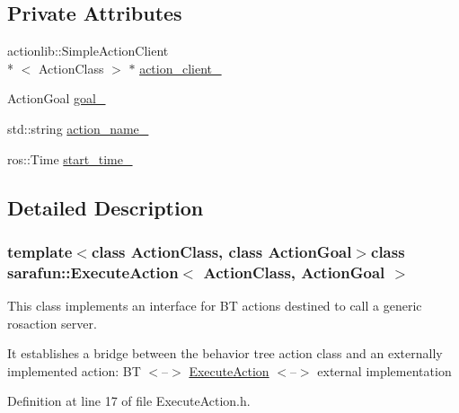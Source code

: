 \subsection*{Private Attributes}
\begin{DoxyCompactItemize}
\item 
actionlib\-::\-Simple\-Action\-Client\\*
$<$ Action\-Class $>$ $\ast$ \hyperlink{classsarafun_1_1ExecuteAction_a8f41836853e5a9daa346b90b865fd113_a8f41836853e5a9daa346b90b865fd113}{action\-\_\-client\-\_\-}
\item 
Action\-Goal \hyperlink{classsarafun_1_1ExecuteAction_a31d3f0c6e50b6abeb68ef6d0cb3c8a4a_a31d3f0c6e50b6abeb68ef6d0cb3c8a4a}{goal\-\_\-}
\item 
std\-::string \hyperlink{classsarafun_1_1ExecuteAction_ac2deed790dd2ff6ef7534fb1a500381f_ac2deed790dd2ff6ef7534fb1a500381f}{action\-\_\-name\-\_\-}
\item 
ros\-::\-Time \hyperlink{classsarafun_1_1ExecuteAction_ad7a81f5e505c421c57bc32fa35e3e84f_ad7a81f5e505c421c57bc32fa35e3e84f}{start\-\_\-time\-\_\-}
\end{DoxyCompactItemize}


\subsection{Detailed Description}
\subsubsection*{template$<$class Action\-Class, class Action\-Goal$>$class sarafun\-::\-Execute\-Action$<$ Action\-Class, Action\-Goal $>$}

This class implements an interface for B\-T actions destined to call a generic rosaction server.

It establishes a bridge between the behavior tree action class and an externally implemented action\-: B\-T $<$--$>$ \hyperlink{classsarafun_1_1ExecuteAction}{Execute\-Action} $<$--$>$ external implementation 

Definition at line 17 of file Execute\-Action.\-h.



